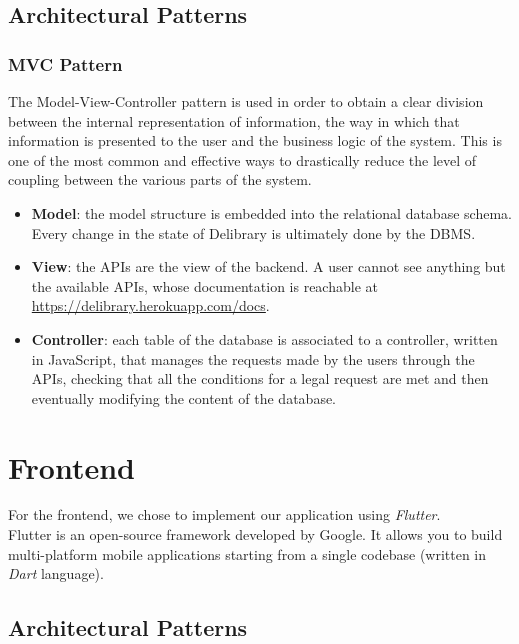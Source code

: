 \subsection{Architectural Patterns}

\subsubsection{MVC Pattern}
The Model-View-Controller pattern is used in order to obtain a clear division between the internal representation of information, the way in which that information is presented to the user and the business logic of the system.
This is one of the most common and effective ways to drastically reduce the level of coupling between the various parts of the system.

\begin{itemize}
      \item \textbf{Model}:
            the model structure is embedded into the relational database schema.
            Every change in the state of Delibrary is ultimately done by the DBMS.
      \item \textbf{View}:
            the APIs are the view of the backend. A user cannot see anything but the available APIs, whose documentation is reachable at \href{https://delibrary.herokuapp.com/docs/}{https://delibrary.herokuapp.com/docs}.
      \item \textbf{Controller}:
            each table of the database is associated to a controller, written in JavaScript, that manages the requests made by the users through the APIs, checking that all the conditions for a legal request are met and then eventually modifying the content of the database.
\end{itemize}

\section{Frontend}
For the frontend, we chose to implement our application using \emph{Flutter}.\\
Flutter is an open-source framework developed by Google.
It allows you to build multi-platform mobile applications starting from a single codebase (written in \emph{Dart} language).

\subsection{Architectural Patterns}

